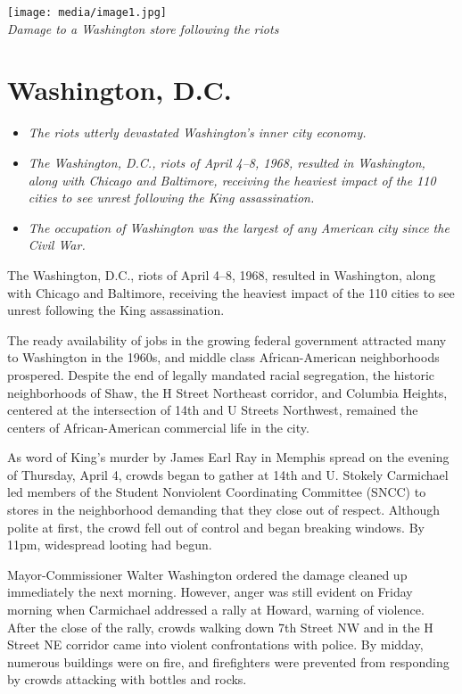 \texttt{[image: media/image1.jpg]}\\
\emph{Damage to a Washington store following the riots}

\section{Washington, D.C.}\label{washington-d.c.}

\begin{itemize}
\item
  \emph{The riots utterly devastated Washington's inner city economy.}
\item
  \emph{The Washington, D.C., riots of April 4--8, 1968, resulted in
  Washington, along with Chicago and Baltimore, receiving the heaviest
  impact of the 110 cities to see unrest following the King
  assassination.}
\item
  \emph{The occupation of Washington was the largest of any American
  city since the Civil War.}
\end{itemize}

The Washington, D.C., riots of April 4--8, 1968, resulted in Washington,
along with Chicago and Baltimore, receiving the heaviest impact of the
110 cities to see unrest following the King assassination.

The ready availability of jobs in the growing federal government
attracted many to Washington in the 1960s, and middle class
African-American neighborhoods prospered. Despite the end of legally
mandated racial segregation, the historic neighborhoods of Shaw, the H
Street Northeast corridor, and Columbia Heights, centered at the
intersection of 14th and U Streets Northwest, remained the centers of
African-American commercial life in the city.

As word of King's murder by James Earl Ray in Memphis spread on the
evening of Thursday, April 4, crowds began to gather at 14th and U.
Stokely Carmichael led members of the Student Nonviolent Coordinating
Committee (SNCC) to stores in the neighborhood demanding that they close
out of respect. Although polite at first, the crowd fell out of control
and began breaking windows. By 11pm, widespread looting had begun.

Mayor-Commissioner Walter Washington ordered the damage cleaned up
immediately the next morning. However, anger was still evident on Friday
morning when Carmichael addressed a rally at Howard, warning of
violence. After the close of the rally, crowds walking down 7th Street
NW and in the H Street NE corridor came into violent confrontations with
police. By midday, numerous buildings were on fire, and firefighters
were prevented from responding by crowds attacking with bottles and
rocks.

